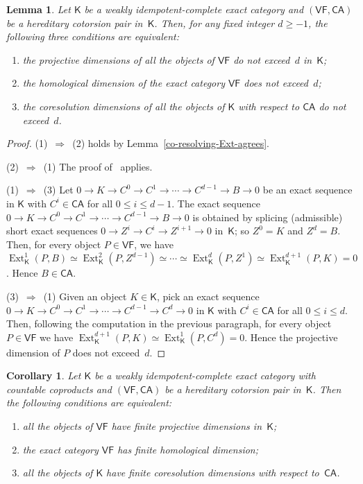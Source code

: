 \documentclass[12pt,a4paper]{amsart}
\newcommand{\+}{\nobreakdash-}
\renewcommand{\:}{\colon}
\newcommand{\rarrow}{\longrightarrow}
\DeclareMathOperator{\Ext}{Ext}
\newcommand{\sK}{\mathsf K}
\newcommand{\VF}{\mathsf{VF}}
\newcommand{\CA}{\mathsf{CA}}
\theoremstyle{plain}
\newtheorem{lem}[thm]{Lemma}
\newtheorem{cor}[thm]{Corollary}
\theoremstyle{definition}
\begin{document}
\begin{lem} \label{very-flat-type-cotorsion-pair-lemma}
 Let\/ $\sK$ be a weakly idempotent-complete exact category and
$(\VF,\CA)$ be a hereditary cotorsion pair in\/~$\sK$.
 Then, for any fixed integer $d\ge-1$, the following three conditions
are equivalent:
\begin{enumerate}
\item the projective dimensions of all the objects of\/ $\VF$ do not
exceed~$d$ in\/~$\sK$;
\item the homological dimension of the exact category\/ $\VF$ does
not exceed~$d$;
\item the coresolution dimensions of all the objects of\/ $\sK$ with
respect to\/ $\CA$ do not exceed~$d$.
\end{enumerate}
\end{lem}

\begin{proof}
 (1)~$\Longrightarrow$~(2) holds by Lemma~\ref{co-resolving-Ext-agrees}.
 
 (2)~$\Longrightarrow$~(1)
 The proof of~\cite[Lemma~B.1.9\,(4)\,$\Rightarrow$\,(3)]{Pcosh}
applies.

 (1)~$\Longrightarrow$~(3)
 Let $0\rarrow K\rarrow C^0\rarrow C^1\rarrow\dotsb\rarrow C^{d-1}
\rarrow B\rarrow0$ be an exact sequence in $\sK$ with $C^i\in\CA$
for all $0\le i\le d-1$.
 The exact sequence $0\rarrow K\rarrow C^0\rarrow C^1\rarrow\dotsb
\rarrow C^{d-1}\rarrow B\rarrow0$ is obtained by splicing (admissible)
short exact sequences $0\rarrow Z^i\rarrow C^i\rarrow Z^{i+1}\rarrow0$
in~$\sK$; so $Z^0=K$ and $Z^d=B$.
 Then, for every object $P\in\VF$, we have $\Ext^1_\sK(P,B)\simeq
\Ext^2_\sK(P,Z^{d-1})\simeq\dotsb\simeq\Ext^d_\sK(P,Z^1)\simeq
\Ext^{d+1}_\sK(P,K)=0$.
 Hence $B\in\CA$.

 (3)~$\Longrightarrow$~(1)
 Given an object $K\in\sK$, pick an exact sequence $0\rarrow K\rarrow
C^0\rarrow C^1\rarrow\dotsb\rarrow C^{d-1}\rarrow C^d\rarrow0$ in $\sK$
with $C^i\in\CA$ for all $0\le i\le d$.
 Then, following the computation in the previous paragraph, for every
object $P\in\VF$ we have $\Ext^{d+1}_\sK(P,K)\simeq\Ext^1_\sK(P,C^d)=0$.
 Hence the projective dimension of $P$ does not exceed~$d$.
\end{proof}

\begin{cor} \label{very-flat-type-cotorsion-pair-cor}
 Let\/ $\sK$ be a weakly idempotent-complete exact category with
countable coproducts and $(\VF,\CA)$ be a hereditary cotorsion pair
in\/~$\sK$.
 Then the following conditions are equivalent:
\begin{enumerate}
\item all the objects of\/ $\VF$ have finite projective dimensions
in\/~$\sK$;
\item the exact category\/ $\VF$ has finite homological dimension;
\item all the objects of\/ $\sK$ have finite coresolution dimensions
with respect to\/~$\CA$.
\end{enumerate}
\end{cor}
\end{document}
